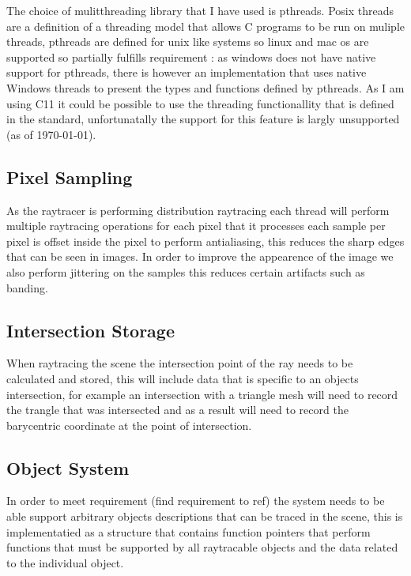 The choice of mulitthreading library that I have used is pthreads. Posix threads are a definition
of a threading model that allows C programs to be run on muliple threads, pthreads are defined for unix like systems so
linux and mac os are supported so partially fulfills requirement : as windows does not have native
support for pthreads, there is however an implementation that uses native Windows threads to present the types and functions defined
by pthreads. As I am using C11 it could be possible to use the threading functionallity that is defined in the standard,
unfortunatally the support for this feature is largly unsupported (as of \today).

\subsection{Pixel Sampling}
As the raytracer is performing distribution raytracing each thread will perform multiple raytracing operations for each pixel
that it processes each sample per pixel is offset inside the pixel to perform antialiasing, this reduces the sharp edges that
can be seen in images. In order to improve the appearence of the image we also perform jittering on the samples this reduces
certain artifacts such as banding. 


\subsection{Intersection Storage}
When raytracing the scene the intersection point of the ray needs to be calculated and stored, this will include data that
is specific to an objects intersection, for example an intersection with a triangle mesh will need to record the trangle
that was intersected and as a result will need to record the barycentric coordinate at the point of intersection.

\subsection{Object System}
In order to meet requirement \todo(find requirement to ref) the system needs to be able support arbitrary objects descriptions
that can be traced in the scene, this is implementatied as a structure that contains function pointers that perform functions
that must be supported by all raytracable objects and the data related to the individual object.

